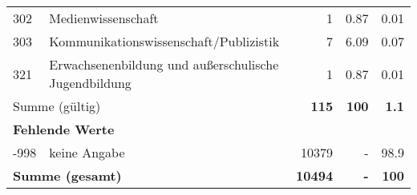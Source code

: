 \begin{longtable}{lXrrr}
        302 & \multicolumn{1}{X}{Medienwissenschaft} & %
          \num{1} &
          \num[round-mode=places,round-precision=2]{0.87} &
          \num[round-mode=places,round-precision=2]{0.01} \\

        303 & \multicolumn{1}{X}{Kommunikationswissenschaft/Publizistik} & %
          \num{7} &
          \num[round-mode=places,round-precision=2]{6.09} &
          \num[round-mode=places,round-precision=2]{0.07} \\

        321 & \multicolumn{1}{X}{Erwachsenenbildung und außerschulische Jugendbildung} & %
          \num{1} &
          \num[round-mode=places,round-precision=2]{0.87} &
          \num[round-mode=places,round-precision=2]{0.01} \\

     \midrule
     \multicolumn{2}{l}{Summe (gültig)} &
       \textbf{\num{115}} &
     \textbf{\num{100}} &
       \textbf{\num[round-mode=places,round-precision=2]{1.1}} \\
     \multicolumn{5}{l}{\textbf{Fehlende Werte}}\\
       -998 &
       keine Angabe &
         \num{10379} &
        - &
         \num[round-mode=places,round-precision=2]{98.9} \\
     \midrule
     \multicolumn{2}{l}{\textbf{Summe (gesamt)}} &
          \textbf{\num{10494}} &
        \textbf{-} &
        \textbf{\num{100}} \\
     \bottomrule
     \end{longtable}
     
